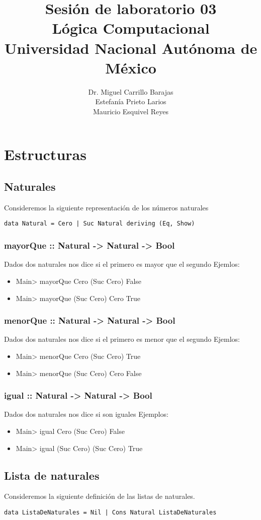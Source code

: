 \documentclass[11pt]{article}
\author{Dr. Miguel Carrillo Barajas \\
Estefanía Prieto Larios \\
Mauricio Esquivel Reyes \\
}
\date{}
\title{Sesión de laboratorio 03 \\
Lógica Computacional \\
Universidad Nacional Autónoma de México}
\begin{document}
\maketitle
\section{Estructuras}
\label{sec:org3d4d614}
\subsection{Naturales}
\label{sec:org2740e15}
Consideremos la siguiente representación de los números naturales

\begin{verbatim}
data Natural = Cero | Suc Natural deriving (Eq, Show)
\end{verbatim}
\subsubsection{mayorQue :: Natural -> Natural -> Bool}
\label{sec:orgef08437}
Dados dos naturales nos dice si el primero es mayor que el segundo
Ejemlos:
\begin{itemize}
\item Main> mayorQue Cero (Suc Cero)
False
\item Main> mayorQue (Suc Cero) Cero
True
\end{itemize}
\subsubsection{menorQue :: Natural -> Natural -> Bool}
\label{sec:org0ea04b6}
Dados dos naturales nos dice si el primero es menor que el segundo
Ejemlos:
\begin{itemize}
\item Main> menorQue Cero (Suc Cero)
True
\item Main> menorQue (Suc Cero) Cero
False
\end{itemize}
\subsubsection{igual :: Natural -> Natural -> Bool}
\label{sec:org531da9b}
Dados dos naturales nos dice si son iguales
Ejemplos:
\begin{itemize}
\item Main> igual Cero (Suc Cero)
False
\item Main> igual (Suc Cero) (Suc Cero)
True
\end{itemize}
\subsection{Lista de naturales}
\label{sec:org83dcdc8}
Consideremos la siguiente definición de las listas de naturales.
\begin{verbatim}
data ListaDeNaturales = Nil | Cons Natural ListaDeNaturales
\end{verbatim}
\end{document}
